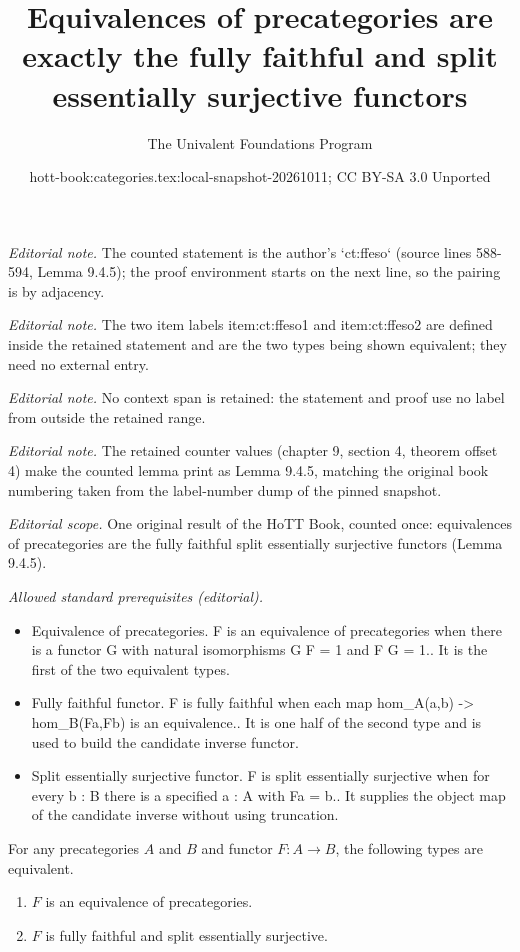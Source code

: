 \documentclass[10pt,a4paper]{article}
\title{Equivalences of precategories are exactly the fully faithful and split essentially surjective functors}
\author{The Univalent Foundations Program}
\date{hott-book:categories.tex:local-snapshot-20261011; CC BY-SA 3.0 Unported}
\newcounter{chapter}
\theoremstyle{definition}
\theoremstyle{remark}
\numberwithin{equation}{section}
\begin{document}
\maketitle
\setcounter{chapter}{9}
\setcounter{section}{4}
\setcounter{thm}{4}
\noindent\textit{Editorial note.} The counted statement is the author's `ct:ffeso` (source lines 588-594, Lemma 9.4.5); the proof environment starts on the next line, so the pairing is by adjacency.\par\medskip
\noindent\textit{Editorial note.} The two item labels item:ct:ffeso1 and item:ct:ffeso2 are defined inside the retained statement and are the two types being shown equivalent; they need no external entry.\par\medskip
\noindent\textit{Editorial note.} No context span is retained: the statement and proof use no label from outside the retained range.\par\medskip
\noindent\textit{Editorial note.} The retained counter values (chapter 9, section 4, theorem offset 4) make the counted lemma print as Lemma 9.4.5, matching the original book numbering taken from the label-number dump of the pinned snapshot.\par\medskip
\noindent\textit{Editorial scope.} One original result of the HoTT Book, counted once: equivalences of precategories are the fully faithful split essentially surjective functors (Lemma 9.4.5).\par\medskip
\noindent\textit{Allowed standard prerequisites (editorial).}\begin{itemize}
\item Equivalence of precategories. F is an equivalence of precategories when there is a functor G with natural isomorphisms G F = 1 and F G = 1.. It is the first of the two equivalent types.
\item Fully faithful functor. F is fully faithful when each map hom\_A(a,b) -> hom\_B(Fa,Fb) is an equivalence.. It is one half of the second type and is used to build the candidate inverse functor.
\item Split essentially surjective functor. F is split essentially surjective when for every b : B there is a specified a : A with Fa = b.. It supplies the object map of the candidate inverse without using truncation.
\end{itemize}\medskip
\begin{lem}\label{ct:ffeso}
  For any precategories $A$ and $B$ and functor $F:A\to B$, the following types are equivalent.
  \begin{enumerate}
  \item $F$ is an equivalence of precategories.\label{item:ct:ffeso1}
  \item $F$ is fully faithful and split essentially surjective.\label{item:ct:ffeso2}
  \end{enumerate}
\end{lem}
\end{document}
